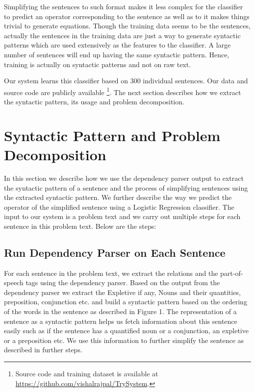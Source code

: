 \documentclass[11pt]{article}
\begin{document}
Simplifying the sentences to such format makes it less complex for the classifier to predict an operator corresponding to the sentence as well as to it makes things trivial to generate equations. Though the training data seems to be the sentences, actually the sentences in the training data are just a way to generate syntactic patterns which are used extensively as the features to the classifier. A large number of sentences will end up having the same syntactic pattern. Hence, training is actually on syntactic patterns and not on raw text.

Our system learns this classifier based on 300 individual sentences. Our data and source code are publicly available \footnote{Source code and training dataset is available at \url{https://github.com/vishalrajpal/TrySystem}.}. The next section describes how we extract the syntactic pattern, its usage and problem decomposition.


\section{Syntactic Pattern and Problem Decomposition}
\label{method}
In this section we describe how we use the dependency parser output to extract the syntactic pattern of a sentence and the process of simplifying sentences using the extracted syntactic pattern. We further describe the way we predict the operator of the simplified sentence using a Logistic Regression classifier. The input to our system is a problem text and we carry out multiple steps for each sentence in this problem text. Below are the steps:

\subsection{Run Dependency Parser on Each Sentence}
For each sentence in the problem text, we extract the relations and the part-of-speech tags using the dependency parser. Based on the output from the dependency parser we extract the Expletive if any, Nouns and their quantities, preposition, conjunction etc. and build a syntactic pattern based on the ordering of the words in the sentence as described in Figure 1. The representation of a sentence as a syntactic pattern helps us fetch information about this sentence easily such as if the sentence has a quantified noun or a conjunction, an expletive or a preposition etc. We use this information to further simplify the sentence as described in further steps. 
\end{document}
